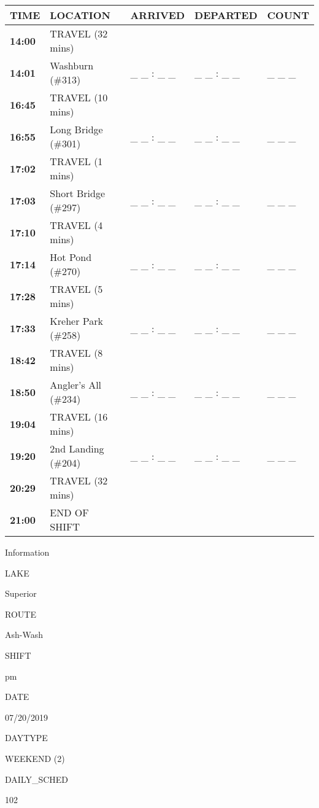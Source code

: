 \documentclass[]{article}
\begin{document}
\begin{tabular}{>{\bfseries}lllll}
\toprule
\textbf{TIME} & \textbf{LOCATION} & \textbf{ARRIVED} & \textbf{DEPARTED} & \textbf{COUNT}\\
\midrule
14:00 & TRAVEL (32 mins) &  &  & \\
14:01 & Washburn (\#313) & \_ \_ : \_ \_ & \_ \_ : \_ \_ & \_ \_ \_\\
16:45 & TRAVEL (10 mins) &  &  & \\
16:55 & Long Bridge (\#301) & \_ \_ : \_ \_ & \_ \_ : \_ \_ & \_ \_ \_\\
17:02 & TRAVEL (1 mins) &  &  & \\
17:03 & Short Bridge (\#297) & \_ \_ : \_ \_ & \_ \_ : \_ \_ & \_ \_ \_\\
17:10 & TRAVEL (4 mins) &  &  & \\
17:14 & Hot Pond (\#270) & \_ \_ : \_ \_ & \_ \_ : \_ \_ & \_ \_ \_\\
17:28 & TRAVEL (5 mins) &  &  & \\
17:33 & Kreher Park (\#258) & \_ \_ : \_ \_ & \_ \_ : \_ \_ & \_ \_ \_\\
18:42 & TRAVEL (8 mins) &  &  & \\
18:50 & Angler's All (\#234) & \_ \_ : \_ \_ & \_ \_ : \_ \_ & \_ \_ \_\\
19:04 & TRAVEL (16 mins) &  &  & \\
19:20 & 2nd Landing (\#204) & \_ \_ : \_ \_ & \_ \_ : \_ \_ & \_ \_ \_\\
20:29 & TRAVEL (32 mins) &  &  & \\
21:00 & END OF SHIFT &  &  & \\
\bottomrule
\end{tabular}\newpage

Information

LAKE

Superior

ROUTE

Ash-Wash

SHIFT

pm

DATE

07/20/2019

DAYTYPE

WEEKEND (2)

DAILY\_SCHED

102

\vspace{24pt}
\end{document}
